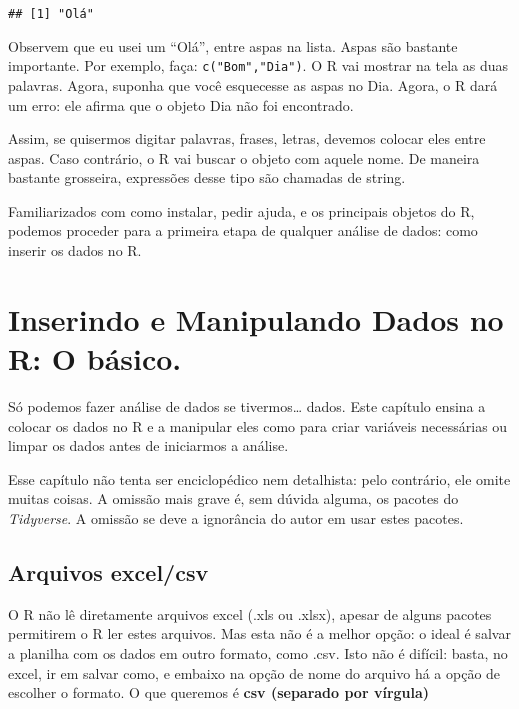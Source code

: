 \documentclass[
]{book}
\begin{document}
\begin{verbatim}
## [1] "Olá"
\end{verbatim}

Observem que eu usei um ``Olá'', entre aspas na lista. Aspas são bastante importante. Por exemplo, faça: \texttt{c("Bom","Dia")}. O R vai mostrar na tela as duas palavras. Agora, suponha que você esquecesse as aspas no Dia. Agora, o R dará um erro: ele afirma que o objeto Dia não foi encontrado.

Assim, se quisermos digitar palavras, frases, letras, devemos colocar eles entre aspas. Caso contrário, o R vai buscar o objeto com aquele nome. De maneira bastante grosseira, expressões desse tipo são chamadas de string.

Familiarizados com como instalar, pedir ajuda, e os principais objetos do R, podemos proceder para a primeira etapa de qualquer análise de dados: como inserir os dados no R.

\hypertarget{inserindo-e-manipulando-dados-no-r-o-buxe1sico.}{%
\chapter{Inserindo e Manipulando Dados no R: O básico.}\label{inserindo-e-manipulando-dados-no-r-o-buxe1sico.}}

Só podemos fazer análise de dados se tivermos\ldots{} dados. Este capítulo ensina a colocar os dados no R e a manipular eles como para criar variáveis necessárias ou limpar os dados antes de iniciarmos a análise.

Esse capítulo não tenta ser enciclopédico nem detalhista: pelo contrário, ele omite muitas coisas. A omissão mais grave é, sem dúvida alguma, os pacotes do \emph{Tidyverse}. A omissão se deve a ignorância do autor em usar estes pacotes.

\hypertarget{arquivos-excelcsv}{%
\section{Arquivos excel/csv}\label{arquivos-excelcsv}}

O R não lê diretamente arquivos excel (.xls ou .xlsx), apesar de alguns pacotes permitirem o R ler estes arquivos. Mas esta não é a melhor opção: o ideal é salvar a planilha com os dados em outro formato, como .csv. Isto não é difícil: basta, no excel, ir em salvar como, e embaixo na opção de nome do arquivo há a opção de escolher o formato. O que queremos é \textbf{csv (separado por vírgula)}
\end{document}
